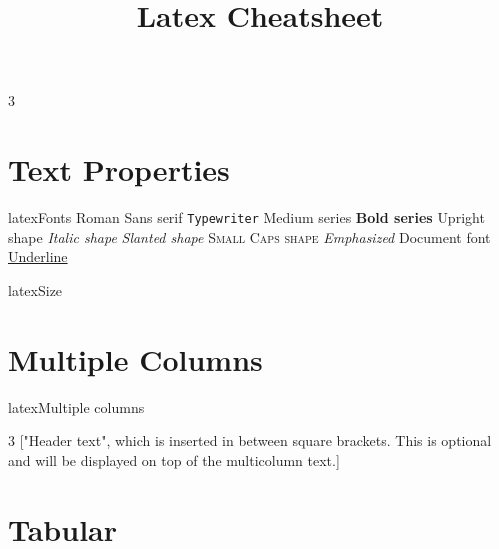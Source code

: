 \documentclass[10pt,a4paper]{article}
\title{\color{w3schools}Latex Cheatsheet
}
\begin{document}
\maketitle

\small
\begin{multicols}{3}

\thispagestyle{empty}
\scriptsize



{\centering\section{Text Properties}}

\begin{codebox}{latex}{Fonts}
\textrm{Roman}
\textsf{Sans serif}
\texttt{Typewriter}
\textmd{Medium series}
\textbf{Bold series}
\textup{Upright shape}
\textit{Italic shape}
\textsl{Slanted shape}
\textsc{Small Caps shape}
\emph{Emphasized}
\textnormal{Document font}
\underline{Underline}

\end{codebox}

\begin{codebox}{latex}{Size}
\tiny \scriptsize \footnotesize \small \normalsize
\large \Large \LARGE \huge \Huge

\end{codebox}

{\centering\section{Multiple Columns}}

\begin{codebox}{latex}{Multiple columns}
\usepackage{multicol}
\setlength{\columnsep}{1cm}
\setlength{\columnseprule}{1pt}
\def\columnseprulecolor{\color{blue}}
\begin{multicols}{3}
["Header text", which is inserted in between square
brackets. This is optional and will be displayed on
top of the multicolumn text.]
\columnbreak
\end{multicols}

\end{codebox}

{\centering\section{Tabular}}


\end{multicols}
\end{document}
